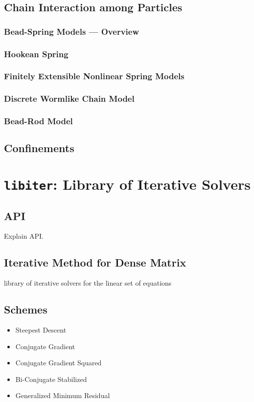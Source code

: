 \documentclass{book}
\begin{document}
\section{Chain Interaction among Particles}
\label{sec:ChainInteraction}

\subsection{Bead-Spring Models --- Overview}

\subsection{Hookean Spring}

\subsection{Finitely Extensible Nonlinear Spring Models}

\subsection{Discrete Wormlike Chain Model}

\subsection{Bead-Rod Model}


\section{Confinements}
\label{sec:Confinements}


\chapter{{\tt libiter}: Library of Iterative Solvers}
\label{chp:libiter}
\section{API}
Explain API.

\section{Iterative Method for Dense Matrix}
library of iterative solvers for the linear set of equations
\cite{IchikiBrady2001}


\section{Schemes}
\begin{itemize}
\item Steepest Descent
\item Conjugate Gradient
\item Conjugate Gradient Squared
\item Bi-Conjugate Stabilized
\item Generalized Minimum Residual
\end{itemize}
\end{document}
